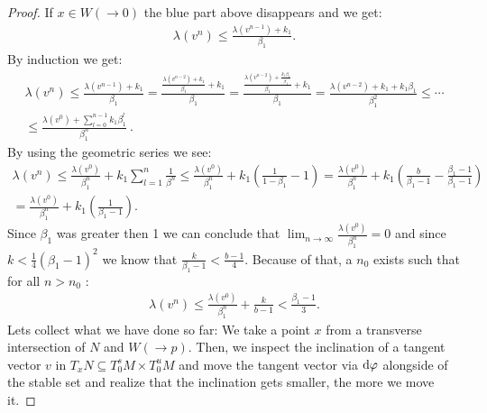 \begin{proof}
		If $x\in W(\to 0)$ the blue part above disappears and we get:
		\begin{align*}
			\lambda(v^n) \leq \frac{\lambda(v^{n-1})+k_1}{\beta_1}.
		\end{align*} By induction we get:
		\begin{align}
			\lambda(v^n)\leq \frac{\lambda(v^{n-1})+k_1}{\beta_1}=\frac{\frac{\lambda(v^{n-2})+k_1}{\beta_1}+k_1}{\beta_1}= \frac{\frac{\lambda(v^{n-2})+\frac{k_1 \beta_1}{\beta_1}}{\beta_1}+k_1}{\beta_1} =\frac{\lambda(v^{n-2})+k_1+ k_1 \beta_1}{\beta_1^2}\leq \cdots \nonumber \\
			\leq \frac{\lambda(v^0)+\sum_{l=0}^{n-1}k_1 \beta_1^l}{\beta_1^n}~. \label{eq: proof lambda lemma estimate lambda(v^n) with x=q}
		\end{align} By using the geometric series we see:
		\begin{align*}
			\lambda(v^n)\leq \frac{\lambda(v^0)}{\beta_1^n}+k_1\sum_{l=1}^n\frac{1}{\beta^n} \leq \frac{\lambda(v^0)}{\beta_1^n}+k_1(\frac{1}{1-\beta_1}-1)=
			\frac{\lambda(v^0)}{\beta_1^n}+k_1(\frac{b}{\beta_1-1}-\frac{\beta_1-1}{\beta_1-1}) \\ =\frac{\lambda(v^0)}{\beta_1^n}+k_1(\frac{1}{\beta_1-1}).
		\end{align*}
		Since $\beta_1$ was greater then 1 we can conclude that $\lim_{n \to \infty}\frac{\lambda(v^0)}{\beta_1^n}=0$ and since $k<\frac{1}{4}(\beta_1-1)^2$ we know that $\frac{k}{\beta_1-1}<\frac{b-1}{4}$. Because of that, a $n_0$ exists such that for all $n>n_0$ :
		\begin{align*}
			\lambda(v^n)\leq \frac{\lambda(v^0)}{\beta_1^n}+\frac{k}{b-1}< \frac{\beta_1-1}{3}.
		\end{align*}  
		Lets collect what we have done so far: We take a point $x$ from a transverse intersection of $N$ and $W(\to p)$. Then, we inspect the inclination of a tangent vector $v$ in ${T_xN\subseteq T^s_0M\times T^u_0M}$ and move the tangent vector via $\mathop{}\!\mathrm{d} \varphi$ alongside of the stable set and realize that the inclination gets smaller, the more we move it. 
		
		
		
		
		

\end{proof}
